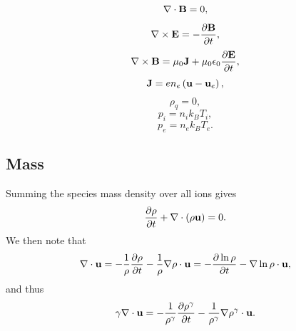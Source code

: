 \documentclass[a4paper,11pt]{report}
\begin{document}
\begin{equation}
    \label{eq:sf_sm_ms_maxwell_4}
    \nabla \cdot \mathbf{B} = 0,
\end{equation}
\begin{equation}
    \label{eq:sf_sm_ms_maxwell_1}
    \nabla \times \mathbf{E} = -\frac{ \partial \mathbf{B}}{\partial t},
\end{equation}
\begin{equation}
    \label{eq:sf_sm_ms_maxwell_2}
    \nabla \times \mathbf{B} = \mu_0 \mathbf{J} + \mu_0 \epsilon_0 \frac{\partial \mathbf{E}}{\partial t},
\end{equation}
\begin{equation}
    \label{eq:sf_sm_ms_curr_density}
    \mathbf{J} = e n_e \left( \mathbf{u} - \mathbf{u}_e \right),
\end{equation}
\begin{equation}
    \label{eq:sf_sm_ms_mass_density}
    \rho_q = 0,
\end{equation}
\begin{equation}
    \label{eq:sf_sm_ms_eos_ion}
    p_i = n_i k_B T_i,
\end{equation}
\begin{equation}
    \label{eq:sf_sm_ms_eos_elec}
    p_e = n_e k_B T_e.
\end{equation}

\subsection{Mass}

Summing the species mass density over all ions gives
\begin{equation}
    \frac{\partial \rho}{\partial t} + \nabla \cdot \left( \rho \mathbf{u} \right) = 0.
\end{equation}
We then note that
\begin{equation*}
    \nabla \cdot \mathbf{u} = -\frac{1}{\rho} \frac{\partial \rho}{\partial t} - \frac{1}{\rho} \nabla \rho \cdot \mathbf{u} = - \frac{\partial \ln{\rho} }{\partial t} -  \nabla \ln{\rho} \cdot \mathbf{u},
\end{equation*}
and thus
\begin{equation}
    \label{eq:mhd_div_trick}
    \gamma \nabla \cdot \mathbf{u} = -\frac{1}{\rho^\gamma} \frac{\partial \rho^\gamma}{\partial t} - \frac{1}{\rho^\gamma} \nabla \rho^\gamma \cdot \mathbf{u}.
\end{equation}

\end{document}

